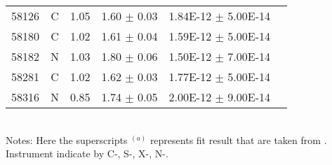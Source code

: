 \begin{table}
\begin{tabular}{lccccc}
58126 & C & 1.05 & 1.60  $\pm$  0.03 & 1.84E-12  $\pm$  5.00E-14 &  \\ 
58180 & C & 1.02 & 1.61  $\pm$  0.04 & 1.59E-12  $\pm$  5.00E-14 &  \\ 
58182 & N & 1.03 & 1.80  $\pm$  0.06 & 1.50E-12  $\pm$  7.00E-14 &  \\ 
58281 & C & 1.02 & 1.62  $\pm$  0.03 & 1.77E-12  $\pm$  5.00E-14 &  \\ 
58316 & N & 0.85 & 1.74  $\pm$  0.05 & 2.00E-12  $\pm$  9.00E-14 &  \\  \hline
\end{tabular}\\
Notes: Here the superscripts $^{(a)}$ represents fit result that are taken from \citet{2017A&A...607L...9K}. Instrument indicate by C-\chandra, S-\swift, X-\xmm, N-\nustar. 
\end{table}